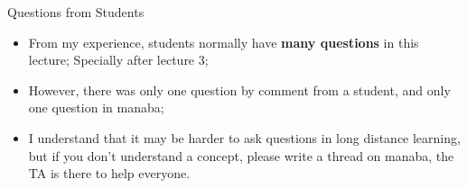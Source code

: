 \begin{frame}{Questions from Students}
  \begin{itemize}
    \item From my experience, students normally have {\bf many questions} in this lecture; Specially after lecture 3;
    \item However, there was only one question by comment from a student, and only one question in manaba;
    \item I understand that it may be harder to ask questions in long distance learning, but if you don't understand a concept, please write a thread on manaba, the TA is there to help everyone.
  \end{itemize}
\end{frame}



